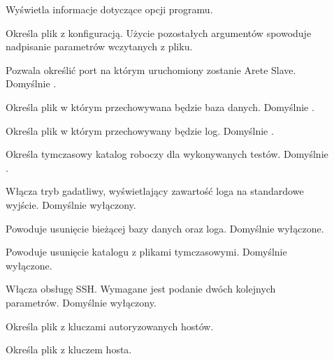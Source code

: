 \documentclass[00-praca-magisterska.tex]{subfiles}
\begin{document}
\begin{description}
\item[]

Wyświetla informacje dotyczące opcji programu.

\item[]

Określa plik z konfiguracją. Użycie pozostałych argumentów spowoduje nadpisanie
parametrów wczytanych z pliku.

\item[]

Pozwala określić port na którym uruchomiony zostanie Arete Slave. Domyślnie
.

\item[]

Określa plik w którym przechowywana będzie baza danych. Domyślnie .

\item[]

Określa plik w którym przechowywany będzie log. Domyślnie .

\item[]

Określa tymczasowy katalog roboczy dla wykonywanych testów. Domyślnie
.

\item[]

Włącza tryb gadatliwy, wyświetlający zawartość loga na standardowe wyjście.
Domyślnie wyłączony.

\item[]

Powoduje usunięcie bieżącej bazy danych oraz loga. Domyślnie wyłączone.

\item[]

Powoduje usunięcie katalogu z plikami tymczasowymi. Domyślnie wyłączone.

\item[]

Włącza obsługę SSH. Wymagane jest podanie dwóch kolejnych parametrów. Domyślnie
wyłączony.

\item[]

Określa plik z kluczami autoryzowanych hostów.

\item[]

Określa plik z kluczem hosta.

\end{description}
\end{document}
